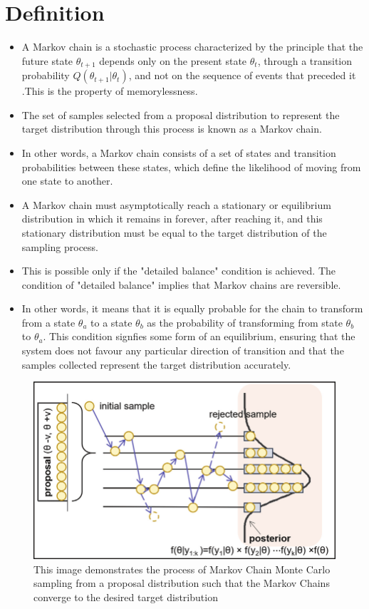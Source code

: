 \documentclass{article}
\begin{document}
\section{Definition}
\begin{itemize}
    \item A Markov chain is a stochastic process characterized by the principle that the future state $\theta_{t+1}$ depends only on the present state $\theta_t$, through a transition probability $Q(\theta_{t+1}|\theta_t)$, and not on the sequence of events that preceded it \cite{bailer2017practical,10.1119/5.0122488}.This is the property of memorylessness.
    \item The set of samples selected from a proposal distribution to represent the target distribution through this process is known as a Markov chain.
    \item In other words, a Markov chain consists of a set of states and transition probabilities between these states, which define the likelihood of moving from one state to another.
    \item A Markov chain must asymptotically reach a stationary or equilibrium distribution in which it remains in forever, after reaching it, and this stationary distribution must be equal to the target distribution of the sampling process.
    \item This is possible only if the "detailed balance" condition is achieved. The condition of "detailed balance" implies that Markov chains are reversible.
    \item  In other words, it means that it is equally probable for the chain to transform from a state $\theta_a$ to a state $\theta_b$ as the probability of transforming from state $\theta_b$ to $\theta_a$. This condition signfies some form of an equilibrium, ensuring that the system does not favour any particular direction of transition and that the samples collected represent the target distribution accurately. 
\end{itemize}
\begin{figure}
    \centering
    \includegraphics[width=0.5\linewidth]{mcmc.png}
    \caption{This image demonstrates the process of Markov Chain Monte Carlo sampling from a proposal distribution such that the Markov Chains converge to the desired target distribution}
    \label{fig:mcmcdemo}
\end{figure}
\end{document}
